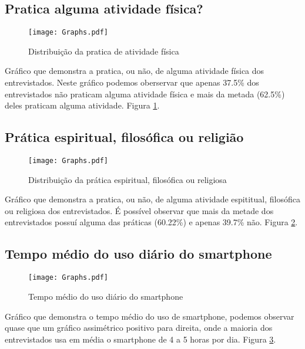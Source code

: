 \documentclass[11pt]{scrartcl} %
\begin{document}
\clearpage

\subsection{Pratica alguma atividade física?}

\begin{figure}[h]
  \centering
  \texttt{[image: Graphs.pdf]}
  \label{fig:graph4}
  \caption{Distribuição da pratica de atividade física}
\end{figure}

Gráfico que demonstra a pratica, ou não, de alguma atividade física dos entrevistados. Neste gráfico podemos oberservar que apenas 37.5\% dos entrevistados não praticam alguma atividade física e mais da metada (62.5\%) deles praticam alguma atividade. Figura \ref{fig:graph4}.

\clearpage

\subsection{Prática espiritual, filosófica ou religião}

\begin{figure}[h]
  \centering
  \texttt{[image: Graphs.pdf]}
  \label{fig:graph5}
  \caption{Distribuição da prática espiritual, filosófica ou religiosa}
\end{figure}

Gráfico que demonstra a pratica, ou não, de alguma atividade espititual, filosófica ou religiosa dos entrevistados. É possível observar que mais da metade dos entrevistados possuí alguma das práticas (60.22\%) e apenas 39.7\% não. Figura \ref{fig:graph5}.

\clearpage

\subsection{Tempo médio do uso diário do smartphone}

\begin{figure}[h]
  \centering
  \texttt{[image: Graphs.pdf]}
  \label{fig:graph6}
  \caption{Tempo médio do uso diário do smartphone}
\end{figure}

Gráfico que demonstra o tempo médio do uso de smartphone, podemos observar quase que um gráfico assimétrico positivo para direita, onde a maioria dos entrevistados usa em média o smartphone de 4 a 5 horas por dia. Figura \ref{fig:graph6}.
\end{document}
